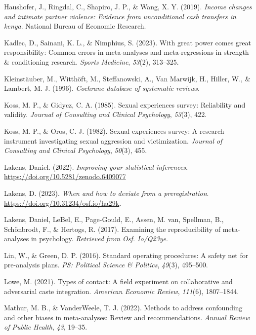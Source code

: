 \documentclass[
  man]{apa6}
\newlength{\cslhangindent}
\newenvironment{CSLReferences}[2] %
 {\begin{list}{}{%
  \setlength{\itemindent}{0pt}
  \setlength{\leftmargin}{0pt}
  \setlength{\parsep}{0pt}
  \ifodd #1
   \setlength{\leftmargin}{\cslhangindent}
   \setlength{\itemindent}{-1\cslhangindent}
  \fi
  \setlength{\itemsep}{#2\baselineskip}}}
 {\end{list}}
\begin{document}
\begin{CSLReferences}{1}{0}
Haushofer, J., Ringdal, C., Shapiro, J. P., \& Wang, X. Y. (2019). \emph{Income changes and intimate partner violence: Evidence from unconditional cash transfers in kenya}. National Bureau of Economic Research.

Kadlec, D., Sainani, K. L., \& Nimphius, S. (2023). With great power comes great responsibility: Common errors in meta-analyses and meta-regressions in strength \& conditioning research. \emph{Sports Medicine}, \emph{53}(2), 313--325.

Kleinstäuber, M., Witthöft, M., Steffanowski, A., Van Marwijk, H., Hiller, W., \& Lambert, M. J. (1996). \emph{Cochrane database of systematic reviews}.

Koss, M. P., \& Gidycz, C. A. (1985). Sexual experiences survey: Reliability and validity. \emph{Journal of Consulting and Clinical Psychology}, \emph{53}(3), 422.

Koss, M. P., \& Oros, C. J. (1982). Sexual experiences survey: A research instrument investigating sexual aggression and victimization. \emph{Journal of Consulting and Clinical Psychology}, \emph{50}(3), 455.

Lakens, Daniel. (2022). \emph{Improving your statistical inferences}. \url{https://doi.org/10.5281/zenodo.6409077}

Lakens, D. (2023). \emph{When and how to deviate from a preregistration}. \url{https://doi.org/10.31234/osf.io/ha29k}.

Lakens, Daniel, LeBel, E., Page-Gould, E., Assen, M. van, Spellman, B., Schönbrodt, F., \& Hertogs, R. (2017). Examining the reproducibility of meta-analyses in psychology. \emph{Retrieved from Osf. Io/Q23ye}.

Lin, W., \& Green, D. P. (2016). Standard operating procedures: A safety net for pre-analysis plans. \emph{PS: Political Science \& Politics}, \emph{49}(3), 495--500.

Lowe, M. (2021). Types of contact: A field experiment on collaborative and adversarial caste integration. \emph{American Economic Review}, \emph{111}(6), 1807--1844.

Mathur, M. B., \& VanderWeele, T. J. (2022). Methods to address confounding and other biases in meta-analyses: Review and recommendations. \emph{Annual Review of Public Health}, \emph{43}, 19--35.


\end{CSLReferences}
\end{document}
